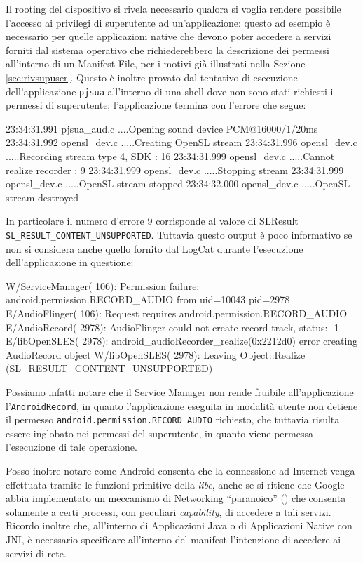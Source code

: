 Il rooting del dispositivo si rivela necessario qualora si voglia rendere possibile
l'accesso ai privilegi di superutente ad un'applicazione: questo ad esempio è 
necessario per quelle applicazioni native che devono poter accedere a servizi forniti
dal sistema operativo che richiederebbero la descrizione dei permessi all'interno di un Manifest
File, per i motivi già illustrati nella Sezione \vref{sec:rivsupuser}. 
Questo è inoltre provato dal tentativo di esecuzione dell'applicazione
\texttt{\small pjsua} all'interno di una shell dove non sono stati richiesti i 
permessi di superutente; l'applicazione termina con l'errore che segue:
\begin{bash}
23:34:31.991    pjsua_aud.c  ....Opening sound device PCM@16000/1/20ms
23:34:31.992   opensl_dev.c  .....Creating OpenSL stream
23:34:31.996   opensl_dev.c  .....Recording stream type 4, SDK : 16
23:34:31.999   opensl_dev.c  .....Cannot realize recorder : 9
23:34:31.999   opensl_dev.c  .....Stopping stream
23:34:31.999   opensl_dev.c  .....OpenSL stream stopped
23:34:32.000   opensl_dev.c  .....OpenSL stream destroyed
\end{bash}
In particolare il numero d'errore 9 corrisponde al valore di SLResult \\
\texttt{\small SL\_RESULT\_CONTENT\_UNSUPPORTED}.
Tuttavia questo output è poco informativo se non si considera anche quello
fornito dal LogCat durante l'esecuzione dell'applicazione in questione:
\begin{bash}
W/ServiceManager(  106): Permission failure: android.permission.RECORD_AUDIO from uid=10043 pid=2978
E/AudioFlinger(  106): Request requires android.permission.RECORD_AUDIO
E/AudioRecord( 2978): AudioFlinger could not create record track, status: -1
E/libOpenSLES( 2978): android_audioRecorder_realize(0x2212d0) error creating AudioRecord object
W/libOpenSLES( 2978): Leaving Object::Realize (SL_RESULT_CONTENT_UNSUPPORTED)
\end{bash}
Possiamo infatti notare che il Service Manager non rende fruibile all'applicazione
l'\texttt{\small AndroidRecord}, in quanto l'applicazione eseguita in modalità utente
non detiene il permesso \texttt{\small android.permission.RECORD\_AUDIO} richiesto,
che tuttavia risulta essere inglobato nei permessi del superutente, in quanto
viene permessa l'esecuzione di tale operazione.
 
Posso inoltre notare come Android consenta che la connessione ad Internet venga
effettuata tramite le funzioni primitive della \textit{libc}, anche se si ritiene che
Google abbia implementato un meccanismo di Networking ``paranoico'' (\parencite[vedi][37]{libro:embedded})
che consenta solamente a certi processi, con peculiari \textit{capability}, di
accedere a tali servizi. Ricordo inoltre che, all'interno di Applicazioni Java
o di Applicazioni Native con JNI, è necessario specificare all'interno del manifest
l'intenzione di accedere ai servizi di rete.

